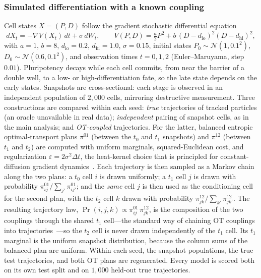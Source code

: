 \documentclass[10pt,letterpaper]{article}
\begin{document}
\subsubsection*{Simulated differentiation with a known coupling}
Cell states $X=(P,D)$ follow the gradient stochastic differential equation
\begin{equation}
dX_t=-\nabla V(X_t)\,dt+\sigma\,dW_t,\qquad V(P,D)=\tfrac{a}{2}P^2+b\,(D-d_{\mathrm{lo}})^2(D-d_{\mathrm{hi}})^2,
\label{eq:sde}
\end{equation}
with $a=1$, $b=8$, $d_{\mathrm{lo}}=0.2$, $d_{\mathrm{hi}}=1.0$, $\sigma=0.15$, initial states $P_0\sim\mathcal{N}(1,0.1^2)$, $D_0\sim\mathcal{N}(0.6,0.1^2)$, and observation times $t=0,1,2$ (Euler--Maruyama, step $0.01$). Pluripotency decays while each cell commits, from near the barrier of a double well, to a low- or high-differentiation fate, so the late state depends on the early states. Snapshots are cross-sectional: each stage is observed in an independent population of $2{,}000$ cells, mirroring destructive measurement. Three constructions are compared within each seed: \emph{true} trajectories of tracked particles (an oracle unavailable in real data); \emph{independent} pairing of snapshot cells, as in the main analysis; and \emph{OT-coupled} trajectories. For the latter, balanced entropic optimal-transport plans $\pi^{01}$ (between the $t_0$ and $t_1$ snapshots) and $\pi^{12}$ (between $t_1$ and $t_2$) are computed with uniform marginals, squared-Euclidean cost, and regularization $\varepsilon=2\sigma^2\Delta t$, the heat-kernel choice that is principled for constant-diffusion gradient dynamics~\cite{lavenant2024toward}. Each trajectory is then sampled as a Markov chain along the two plans: a $t_0$ cell $i$ is drawn uniformly; a $t_1$ cell $j$ is drawn with probability $\pi^{01}_{ij}/\sum_{j'}\pi^{01}_{ij'}$; and the \emph{same} cell $j$ is then used as the conditioning cell for the second plan, with the $t_2$ cell $k$ drawn with probability $\pi^{12}_{jk}/\sum_{k'}\pi^{12}_{jk'}$. The resulting trajectory law, $\Pr(i,j,k)\propto\pi^{01}_{ij}\,\pi^{12}_{jk}$, is the composition of the two couplings through the shared $t_1$ cell---the standard way of chaining OT couplings into trajectories~\cite{schiebinger2019optimal}---so the $t_2$ cell is never drawn independently of the $t_1$ cell. Its $t_1$ marginal is the uniform snapshot distribution, because the column sums of the balanced plan are uniform. Within each seed, the snapshot populations, the true test trajectories, and both OT plans are regenerated. Every model is scored both on its own test split and on $1{,}000$ held-out true trajectories.
\end{document}
